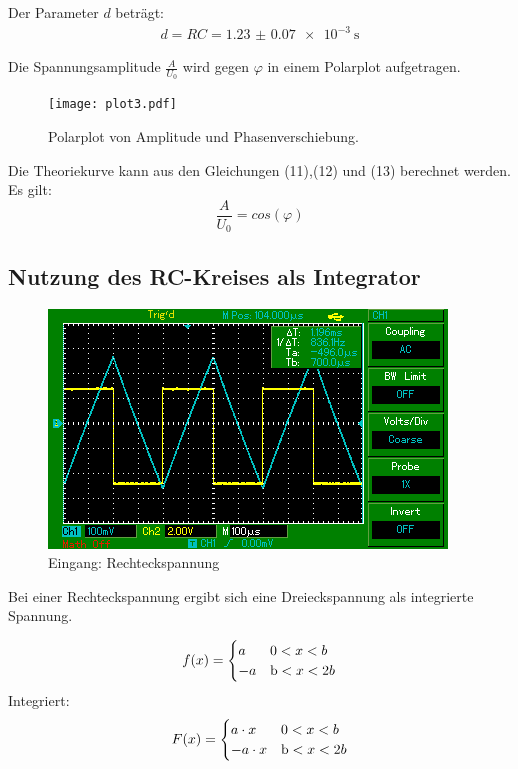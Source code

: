 Der Parameter $d$ beträgt:
\begin{align*}
  d = RC = \SI{1.23(7)e-3}{\second}
\end{align*}

Die Spannungsamplitude $\frac{A}{U_0}$ wird gegen $\varphi$ in einem Polarplot aufgetragen.

\begin{figure}[H]
  \centering
  \texttt{[image: plot3.pdf]}
  \caption{Polarplot von Amplitude und Phasenverschiebung.}
  \label{fig:Polarplot}
\end{figure}

Die Theoriekurve kann aus den Gleichungen (11),(12) und (13) berechnet werden.
Es gilt:
\begin{equation}
  \frac{A}{U_0} = cos(\varphi)
\end{equation}

\subsection{Nutzung des RC-Kreises als Integrator}

\begin{figure}[H]
  \centering
  \includegraphics{MAP001.png}
  \caption{Eingang: Rechteckspannung}
  \label{fig:Rechteckspannung}
\end{figure}

Bei einer Rechteckspannung ergibt sich eine Dreieckspannung als integrierte Spannung.

\begin{equation*}
  f(x) =
  \begin{cases}
    a & \text 0 < x < b \\
    -a & \text b < x < 2b \\
  \end{cases}
\end{equation*}
Integriert:
\begin{equation*}
  F(x) =
  \begin{cases}
    a \cdot x & \text 0 < x < b \\
    -a \cdot x & \text b < x < 2b \\
  \end{cases}
\end{equation*}

